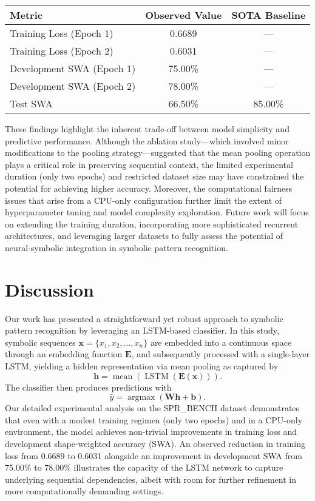 \documentclass{article}
\begin{document}
\begin{table}[h]
\centering
\begin{tabular}{|l|c|c|}
\hline
\textbf{Metric} & \textbf{Observed Value} & \textbf{SOTA Baseline} \\ \hline
Training Loss (Epoch 1) & 0.6689 & --- \\ \hline
Training Loss (Epoch 2) & 0.6031 & --- \\ \hline
Development SWA (Epoch 1) & 75.00\% & --- \\ \hline
Development SWA (Epoch 2) & 78.00\% & --- \\ \hline
Test SWA & 66.50\% & 85.00\% \\ \hline
\end{tabular}
\label{tab:results}
\end{table}

These findings highlight the inherent trade-off between model simplicity and predictive performance. Although the ablation study—which involved minor modifications to the pooling strategy—suggested that the mean pooling operation plays a critical role in preserving sequential context, the limited experimental duration (only two epochs) and restricted dataset size may have constrained the potential for achieving higher accuracy. Moreover, the computational fairness issues that arise from a CPU-only configuration further limit the extent of hyperparameter tuning and model complexity exploration. Future work will focus on extending the training duration, incorporating more sophisticated recurrent architectures, and leveraging larger datasets to fully assess the potential of neural-symbolic integration in symbolic pattern recognition.

\section{Discussion}
Our work has presented a straightforward yet robust approach to symbolic pattern recognition by leveraging an LSTM-based classifier. In this study, symbolic sequences \( \mathbf{x} = \{x_1, x_2, \dots, x_n\} \) are embedded into a continuous space through an embedding function \( \mathbf{E} \), and subsequently processed with a single-layer LSTM, yielding a hidden representation via mean pooling as captured by 
\[
\mathbf{h} = \operatorname{mean}\left(\operatorname{LSTM}\left(\mathbf{E}(\mathbf{x})\right)\right).
\]
The classifier then produces predictions with 
\[
\hat{y} = \operatorname{argmax}\left(\mathbf{W}\mathbf{h} + \mathbf{b}\right).
\]
Our detailed experimental analysis on the SPR\_BENCH dataset demonstrates that even with a modest training regimen (only two epochs) and in a CPU-only environment, the model achieves non-trivial improvements in training loss and development shape-weighted accuracy (SWA). An observed reduction in training loss from 0.6689 to 0.6031 alongside an improvement in development SWA from 75.00\% to 78.00\% illustrates the capacity of the LSTM network to capture underlying sequential dependencies, albeit with room for further refinement in more computationally demanding settings.
\end{document}
